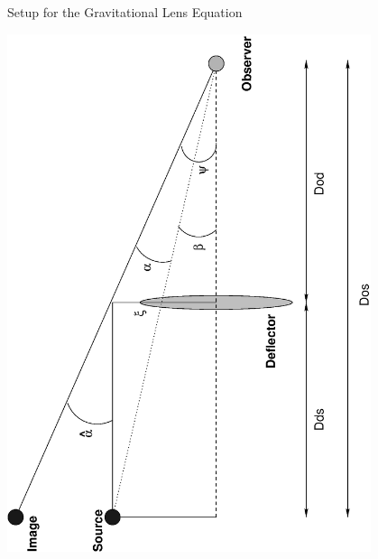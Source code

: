 \documentclass[aspectratio=1610,xcolor=dvipsnames,t]{beamer}
\begin{document}
\begin{frame}{Setup for the Gravitational Lens Equation} 
    \begin{center}
        \includegraphics[angle=-90,width=0.8\textwidth]{images/setup.eps}
    \end{center}
\end{frame} 
\end{document}
